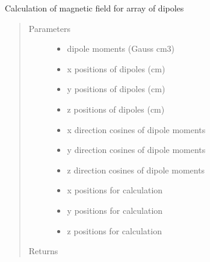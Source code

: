 \documentclass[letterpaper,10pt,english]{sphinxmanual}
\begin{document}
\begin{fulllineitems}
\label{\detokenize{xsrt_functions:xsrt.bfield}}
Calculation of magnetic field for array of dipoles
\begin{quote}\begin{description}
\item[{Parameters}] \leavevmode\begin{itemize}
\item {} 
 \textendash{} dipole moments (Gauss cm3)

\item {} 
 \textendash{} x positions of dipoles (cm)

\item {} 
 \textendash{} y positions of dipoles (cm)

\item {} 
 \textendash{} z positions of dipoles (cm)

\item {} 
 \textendash{} x direction cosines of dipole moments

\item {} 
 \textendash{} y direction cosines of dipole moments

\item {} 
 \textendash{} z direction cosines of dipole moments

\item {} 
 \textendash{} x positions for calculation

\item {} 
 \textendash{} y positions for calculation

\item {} 
 \textendash{} z positions for calculation

\end{itemize}

\item[{Returns}] \leavevmode


\end{description}
\end{quote}
\end{fulllineitems}
\end{document}
